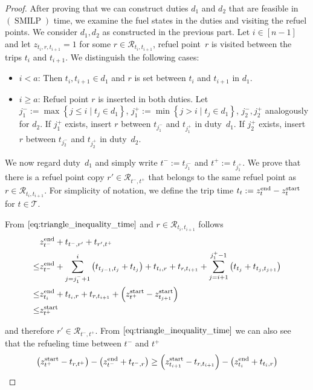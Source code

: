 \begin{proof}
After proving that we can construct duties $d_1$ and $d_2$ that are feasible in $(\operatorname{SMILP})$ \wrt time, we examine the fuel states in the duties and visiting the refuel points. We consider $d_1,d_2$ as constructed in the previous part. Let $i\in[n-1]$ and let ${z_{t_i,r,t_{i+1}}=1}$ for some ${r\in\mathcal{R}_{t_i,t_{i+1}}}$, \ie refuel point~$r$ is visited between the trips $t_i$ and $t_{i+1}$. We distinguish the following cases:
\begin{itemize}
	\item{$i<a$:}
		Then ${t_i,t_{i+1}\in d_1}$ and $r$ is set between $t_i$ and $t_{i+1}$ in $d_1$.
	\item{$i\geq a$:}
		Refuel point $r$ is inserted in both duties. Let ${j^-_1:=\max\left\{j\leq i\mid t_j\in d_1\right\}}$, ${j^+_1:=\min\left\{j>i\mid t_j\in d_1\right\}}$, $j^-_2,j^+_2$ analogously for $d_2$. If $j^+_1$ exists, insert $r$ between $t_{j^-_1}$ and $t_{j^+_1}$ in duty~$d_1$. If $j^+_2$ exists, insert $r$ between $t_{j^-_2}$ and $t_{j^+_2}$ in duty~$d_2$.
\end{itemize}

We now regard duty~$d_1$ and simply write ${t^-:=t_{j^-_1}}$ and ${t^+:=t_{j^+_1}}$. We prove that there is a refuel point copy ${r'\in\mathcal{R}_{t^-,t^+}}$ that belongs to the same refuel point as ${r\in\mathcal{R}_{t_i,t_{i+1}}}$. For simplicity of notation, we define the trip time ${t_t := z^{\operatorname{end}}_{t} - z^{\operatorname{start}}_{t}}$ for ${t\in\mathcal{T}}$.

From $\eqref{eq:triangle_inequality_time}$ and ${r\in\mathcal{R}_{t_i,t_{i+1}}}$ follows
\begin{align*}
	& z^{\operatorname{end}}_{t^-} + t_{t^-,r'} + t_{r',t^+} \\
	\leq & z^{\operatorname{end}}_{t^-} + \sum_{j=j^-_1+1}^i \left(t_{t_{j-1},t_{j}} + t_{t_j}\right) + t_{t_i,r} + t_{r,t_{i+1}} + \sum_{j=i+1}^{j^+_1-1} \left(t_{t_j} + t_{t_{j},t_{j+1}}\right) \\
	\leq & z^{\operatorname{end}}_{t_i} + t_{t_i,r} + t_{r,t_{i+1}} + \left(z^{\operatorname{start}}_{t^+} - z^{\operatorname{start}}_{t_{j+1}}\right) \\
	\leq & z^{\operatorname{start}}_{t^+}
\end{align*}

and therefore ${r'\in\mathcal{R}_{t^-,t^+}}$. From $\eqref{eq:triangle_inequality_time}$ we can also see that the refueling time between $t^-$ and $t^+$
\begin{align*}
	\left(z^{\operatorname{start}}_{t^+} - t_{r,t^+}\right) - \left(z^{\operatorname{end}}_{t^-} + t_{t^-,r}\right) \geq \left(z^{\operatorname{start}}_{t_{i+1}} - t_{r,t_{i+1}}\right) - \left(z^{\operatorname{end}}_{t_i} + t_{t_i,r}\right)
\end{align*}


\end{proof}
